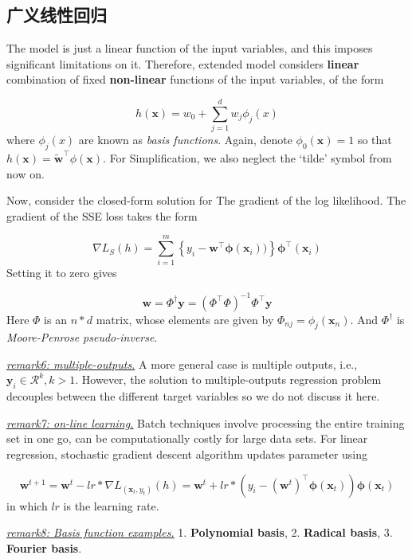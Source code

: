 \documentclass{article}
\begin{document}
	\subsection{广义线性回归}
	
	The model is just a linear function of the input variables, and this imposes significant limitations on it. Therefore, extended model considers \textbf{linear} combination of fixed \textbf{non-linear} functions of the input variables, of the form
	
	\begin{equation}
	h(\mathbf{x}) = w_0 + \sum_{j=1}^d w_j \phi_j(x)
	\end{equation}
where $\phi_j(x)$ are known as \textit{basis functions}. Again, denote $\phi_0(\mathbf{x})=1$ so that $h(\mathbf{x}) = \tilde{\mathbf{w}}^\top \phi(\mathbf{x})$. For Simplification, we also neglect the `tilde' symbol from now on.

	Now, consider the closed-form solution for The gradient of the log likelihood. The gradient of the SSE loss takes the form
	
	\begin{equation*}
	\nabla L_S(h) = \sum_{i=1}^m \left\{ y_i - \mathbf{w}^\top \mathbf{\phi} (\mathbf{x}_i)) \right\} \mathbf{\phi}^\top (\mathbf{x}_i)
	\end{equation*}
Setting it to zero gives 

	\begin{equation}
	\label{eqn:mp_solved}
	\mathbf{w} = \Phi^\dag \mathbf{y} = (\Phi^\top \Phi)^{-1} \Phi^\top \mathbf{y}
	\end{equation}
Here $\Phi$ is an $n*d$ matrix, whose elements are given by $\Phi_{nj} = \phi_j(\mathbf{x}_n)$. And $\Phi^\dag$ is \textit{Moore-Penrose pseudo-inverse}.

	\vspace{2mm}
	\begin{scriptsize}
	\begin{spacing}{1.2}
	{\sffamily 
	\textit{\underline{remark6: multiple-outputs.}} A more general case is multiple outputs, i.e., $\mathbf{y}_i \in \mathcal{R}^k, k>1$. However, the solution to multiple-outputs regression problem decouples between the different target variables so we do not discuss it here.
	
	\textit{\underline{remark7: on-line learning.}} Batch techniques involve processing the entire training set in one go, can be computationally costly for large data sets. For linear regression, stochastic gradient descent algorithm updates parameter using
	
	\begin{equation*}
	\mathbf{w}^{t+1}=\mathbf{w}^{t} - lr*\nabla L_{(\mathbf{x}_t,y_t)}(h) = \mathbf{w}^{t} + lr* (y_i - (\mathbf{w}^t)^\top \mathbf{\phi} (\mathbf{x}_t)) \mathbf{\phi} (\mathbf{x}_t)
	\end{equation*}
in which $lr$ is the learning rate.

	\textit{\underline{remark8: Basis function examples.}} 1. \textbf{Polynomial basis}, 2. \textbf{Radical basis}, 3. \textbf{Fourier basis}.
	}
	\end{spacing}
	\end{scriptsize}
	\vspace{-2mm}
	
\end{document}

